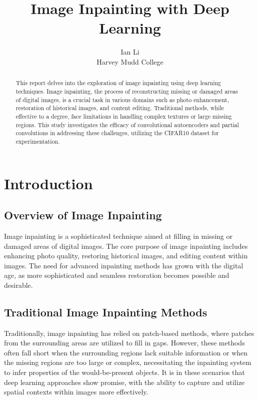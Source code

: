 \documentclass[12pt,a4paper]{article}
\title{Image Inpainting with Deep Learning}
\author{Ian Li \\ Harvey Mudd College}
\date{}
\begin{document}
\maketitle

\begin{abstract}
This report delves into the exploration of image inpainting using deep learning techniques. Image inpainting, the process of reconstructing missing or damaged areas of digital images, is a crucial task in various domains such as photo enhancement, restoration of historical images, and content editing. Traditional methods, while effective to a degree, face limitations in handling complex textures or large missing regions. This study investigates the efficacy of convolutional autoencoders and partial convolutions in addressing these challenges, utilizing the CIFAR10 dataset for experimentation.
\end{abstract}

\section{Introduction}

\subsection{Overview of Image Inpainting}
Image inpainting is a sophisticated technique aimed at filling in missing or damaged areas of digital images. The core purpose of image inpainting includes enhancing photo quality, restoring historical images, and editing content within images. The need for advanced inpainting methods has grown with the digital age, as more sophisticated and seamless restoration becomes possible and desirable.

\subsection{Traditional Image Inpainting Methods}
Traditionally, image inpainting has relied on patch-based methods, where patches from the surrounding areas are utilized to fill in gaps. However, these methods often fall short when the surrounding regions lack suitable information or when the missing regions are too large or complex, necessitating the inpainting system to infer properties of the would-be-present objects. It is in these scenarios that deep learning approaches show promise, with the ability to capture and utilize spatial contexts within images more effectively.
\end{document}
